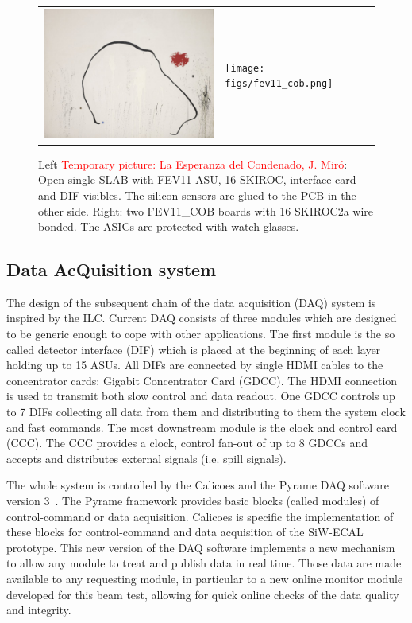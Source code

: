\documentclass[a4paper,11pt]{article}
\newcommand{\todo}[1]{\textcolor{red}{{#1}}}
\begin{document}
\begin{figure}[!t]
  \centering
  \begin{tabular}{ll}
    \includegraphics[width=2.8in]{figs/test.jpg} & \texttt{[image: figs/fev11\_cob.png]} 
  \end{tabular}
  \caption{Left \todo{Temporary picture: La Esperanza del Condenado, J. Miró}: Open single SLAB with FEV11 ASU, 16 SKIROC, interface card and DIF visibles. The silicon sensors are glued to the PCB in the other side.
  Right: two FEV11\_COB boards with 16 SKIROC2a wire bonded. The ASICs are protected with watch glasses.}
\label{ASU}
\end{figure}

\subsection{Data AcQuisition system}
\label{sec:DAQ}

The design of the subsequent chain of the data acquisition (DAQ)\cite{Gastaldi:2014vaa} system is inspired by the ILC.
Current DAQ consists of three modules which are designed to be generic enough to cope with other applications.
The first module is the so called detector interface (DIF) which is placed at the beginning of each layer holding up to 15 ASUs.
All DIFs are connected by single HDMI cables to the concentrator cards: Gigabit Concentrator Card (GDCC).
The HDMI connection is used to transmit both slow control and data readout.
One GDCC controls up to 7 DIFs collecting all data from them and distributing to them the system clock and fast commands.
The most downstream module is the clock and control card (CCC).
The CCC provides a clock, control fan-out of up to 8 GDCCs and accepts and distributes external signals (i.e. spill signals).

The whole system is controlled by the Calicoes and the Pyrame DAQ software version 3~\cite{Rubio-Roy:2017ere,Magniette:2018wdz}.
The Pyrame framework provides basic blocks (called modules) of control-command or data acquisition.
Calicoes is specific the implementation of these blocks for control-command and data acquisition of the SiW-ECAL prototype. 
This new version of the DAQ software implements a new mechanism to allow any module to treat and publish data in real time. 
Those data are made available to any requesting module, in particular to a new online monitor module developed
for this beam test, allowing for quick online checks of the data quality and integrity.
\end{document}
